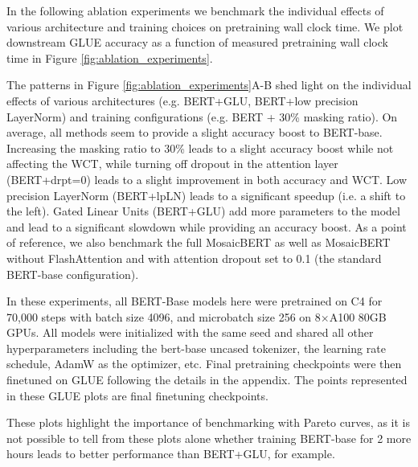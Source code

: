 \documentclass{article}
\begin{document}
In the following ablation experiments we benchmark the individual effects of various architecture and training choices on pretraining wall clock time. We plot downstream GLUE accuracy as a function of measured pretraining wall clock time in Figure \ref{fig:ablation_experiments}. 

The patterns in Figure \ref{fig:ablation_experiments}A-B shed light on the individual effects of various architectures (e.g. BERT+GLU, BERT+low precision LayerNorm) and training configurations (e.g. BERT + 30\% masking ratio). On average, all methods seem to provide a slight accuracy boost to BERT-base. Increasing the masking ratio to 30\% leads to a slight accuracy boost while not affecting the WCT, while turning off dropout in the attention layer (BERT+drpt=0) leads to a slight improvement in both accuracy and WCT. Low precision LayerNorm (BERT+lpLN) leads to a significant speedup (i.e. a shift to the left). Gated Linear Units (BERT+GLU) add more parameters to the model and lead to a significant slowdown while providing an accuracy boost. As a point of reference, we also benchmark the full MosaicBERT as well as MosaicBERT without FlashAttention and with attention dropout set to 0.1 (the standard BERT-base configuration).




In these experiments, all BERT-Base models here were pretrained on C4 for 70,000 steps with batch size 4096, and microbatch size 256 on 8$\times$A100 80GB GPUs. All models were initialized with the same seed and shared all other hyperparameters including the bert-base uncased tokenizer, the learning rate schedule, AdamW as the optimizer, etc. Final pretraining checkpoints were then finetuned on GLUE following the details in the appendix. The points represented in these GLUE plots are final finetuning checkpoints.

These plots highlight the importance of benchmarking with Pareto curves, as it is not possible to tell from these plots alone whether training BERT-base for 2 more hours leads to better performance than BERT+GLU, for example.


\end{document}
